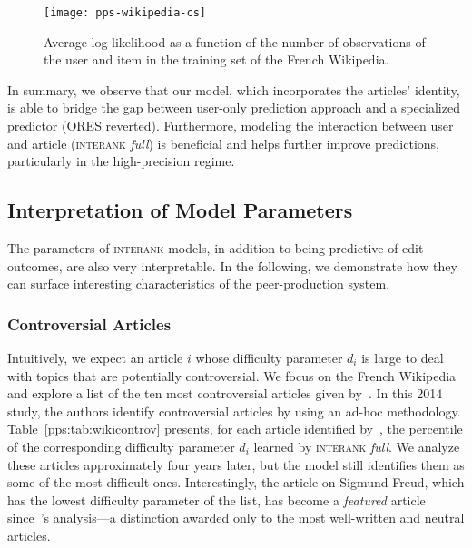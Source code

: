 \begin{figure}
	\centering
	\texttt{[image: pps-wikipedia-cs]}
	\caption{Average log-likelihood as a function of the number of observations of the user and item in the training set of the French Wikipedia.}
	\label{pps:fig:wikics}
\end{figure}

In summary, we observe that our model, which incorporates the articles' identity, is able to bridge the gap between user-only prediction approach and a specialized predictor (ORES reverted).
Furthermore, modeling the interaction between user and article (\textsc{interank} \emph{full}) is beneficial and helps further improve predictions, particularly in the high-precision regime.

\subsection{Interpretation of Model Parameters}

The parameters of \textsc{interank} models, in addition to being predictive of edit outcomes, are also very interpretable.
In the following, we demonstrate how they can surface interesting characteristics of the peer-production system.

\subsubsection{Controversial Articles}
Intuitively, we expect an article $i$ whose difficulty parameter $d_i$ is large to deal with topics that are potentially controversial.
We focus on the French Wikipedia and explore a list of the ten most controversial articles given by~\citet{yasseri2014most}.
In this 2014 study, the authors identify controversial articles by using an ad-hoc methodology.
Table~\ref{pps:tab:wikicontrov} presents, for each article identified by~\citeauthor{yasseri2014most}, the percentile of the corresponding difficulty parameter $d_i$ learned by \textsc{interank} \emph{full}.
We analyze these articles approximately four years later, but the model still identifies them as some of the most difficult ones.
Interestingly, the article on Sigmund Freud, which has the lowest difficulty parameter of the list, has become a \emph{featured} article since~\citeauthor{yasseri2014most}'s analysis---a distinction awarded only to the most well-written and neutral articles.

